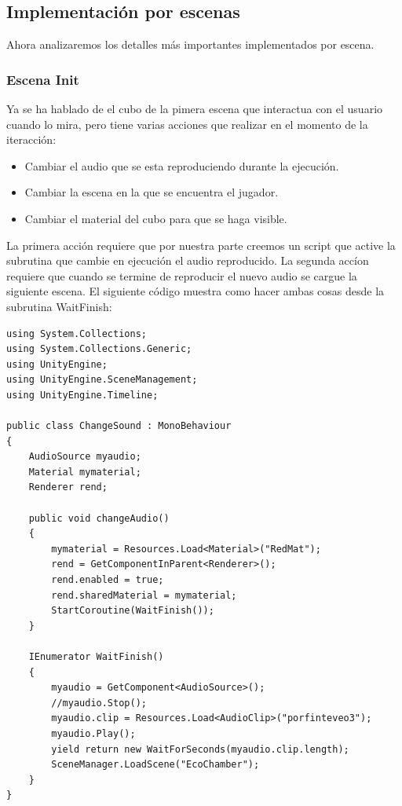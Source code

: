 \subsection{Implementación por escenas}

\quad Ahora analizaremos los detalles más importantes implementados por escena.\\
 
	\subsubsection{Escena Init}

\quad Ya se ha hablado de el cubo de la pimera escena que interactua con el usuario cuando lo mira, pero tiene varias acciones que realizar en el momento de la iteracción:\\

\begin{itemize}
	\item Cambiar el audio que se esta reproduciendo durante la ejecución.
	\item Cambiar la escena en la que se encuentra el jugador.
	\item Cambiar el material del cubo para que se haga visible.
\end{itemize}

\quad La primera acción requiere que por nuestra parte creemos un script que active la subrutina que cambie en ejecución el audio reproducido. La segunda accíon requiere que cuando se termine de reproducir el nuevo audio se cargue la siguiente escena. El siguiente código muestra como hacer ambas cosas desde la subrutina WaitFinish:\\

\lstset{language=[sharp]C, breaklines=true, basicstyle=\footnotesize}
\begin{lstlisting}[frame=single, caption={ChangeSound.cs}]
using System.Collections;
using System.Collections.Generic;
using UnityEngine;
using UnityEngine.SceneManagement;
using UnityEngine.Timeline;

public class ChangeSound : MonoBehaviour
{
    AudioSource myaudio;
    Material mymaterial;
    Renderer rend;

    public void changeAudio()
    {
        mymaterial = Resources.Load<Material>("RedMat");
        rend = GetComponentInParent<Renderer>();
        rend.enabled = true;
        rend.sharedMaterial = mymaterial;
        StartCoroutine(WaitFinish());
    }

    IEnumerator WaitFinish()
    {
        myaudio = GetComponent<AudioSource>();
        //myaudio.Stop();
        myaudio.clip = Resources.Load<AudioClip>("porfinteveo3");
        myaudio.Play();
        yield return new WaitForSeconds(myaudio.clip.length);
        SceneManager.LoadScene("EcoChamber");
    }
}

\end{lstlisting}

